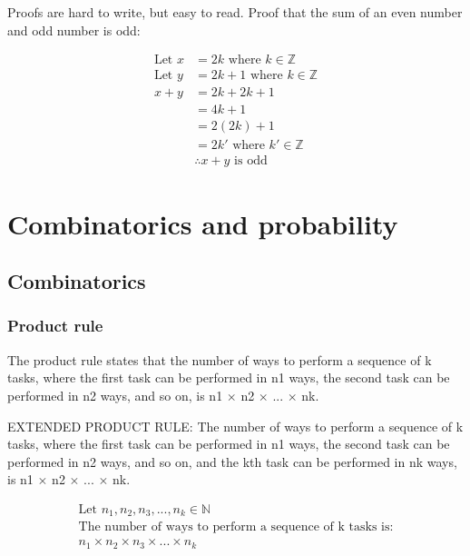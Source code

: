 \documentclass{article}
\begin{document}
Proofs are hard to write, but easy to read.
Proof that the sum of an even number and odd number is odd:

\begin{align*}
    \text{Let } x & = 2k \text{ where } k \in \mathbb{Z}     \\
    \text{Let } y & = 2k + 1 \text{ where } k \in \mathbb{Z} \\
    x + y         & = 2k + 2k + 1                            \\
                  & = 4k + 1                                 \\
                  & = 2(2k) + 1                              \\
                  & = 2k' \text{ where } k' \in \mathbb{Z}   \\
                  & \therefore x + y \text{ is odd}
\end{align*}

\section{Combinatorics and probability}

\subsection{Combinatorics}

\subsubsection{Product rule}

The product rule states that the number of ways to perform a sequence of k tasks, where the first task can be performed in n1 ways, the second task can be performed in n2 ways, and so on, is n1 $\times$ n2 $\times$ ... $\times$ nk.

EXTENDED PRODUCT RULE: The number of ways to perform a sequence of k tasks, where the first task can be performed in n1 ways, the second task can be performed in n2 ways, and so on, and the kth task can be performed in nk ways, is n1 $\times$ n2 $\times$ ... $\times$ nk.

\begin{align*}
    \text{Let } n_1, n_2, n_3, ..., n_k \in \mathbb{N}             \\
    \text{The number of ways to perform a sequence of k tasks is:} \\
    n_1 \times n_2 \times n_3 \times ... \times n_k
\end{align*}
\end{document}
